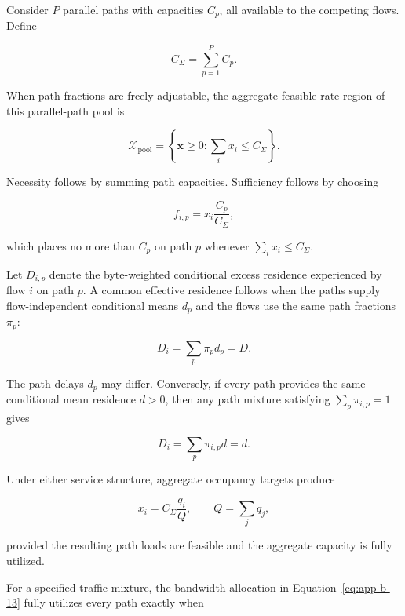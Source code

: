 Consider \(P\) parallel paths with capacities \(C_p\), all available to the competing flows. Define

\begin{equation}
\label{eq:app-b-8}
C_\Sigma=\sum_{p=1}^{P}C_p.
\end{equation}

When path fractions are freely adjustable, the aggregate feasible rate region of this parallel-path pool is

\begin{equation}
\label{eq:app-b-9}
\mathcal X_{\mathrm{pool}}
=
\left\{\mathbf x\ge0:\sum_i x_i\le C_\Sigma\right\}.
\end{equation}

Necessity follows by summing path capacities. Sufficiency follows by choosing

\begin{equation}
\label{eq:app-b-10}
f_{i,p}=x_i\frac{C_p}{C_\Sigma},
\end{equation}

which places no more than \(C_p\) on path \(p\) whenever \(\sum_i x_i\le C_\Sigma\).

Let \(D_{i,p}\) denote the byte-weighted conditional excess residence experienced by flow \(i\) on path \(p\). A common effective residence follows when the paths supply flow-independent conditional means \(d_p\) and the flows use the same path fractions \(\pi_p\):

\begin{equation}
\label{eq:app-b-11}
D_i=\sum_p\pi_pd_p=D.
\end{equation}

The path delays \(d_p\) may differ. Conversely, if every path provides the same conditional mean residence \(d>0\), then any path mixture satisfying \(\sum_p\pi_{i,p}=1\) gives

\begin{equation}
\label{eq:app-b-12}
D_i=\sum_p\pi_{i,p}d=d.
\end{equation}

Under either service structure, aggregate occupancy targets produce

\begin{equation}
\label{eq:app-b-13}
x_i=C_\Sigma\frac{q_i}{Q},
\qquad Q=\sum_jq_j,
\end{equation}

provided the resulting path loads are feasible and the aggregate capacity is fully utilized.

For a specified traffic mixture, the bandwidth allocation in Equation~\eqref{eq:app-b-13} fully utilizes every path exactly when

